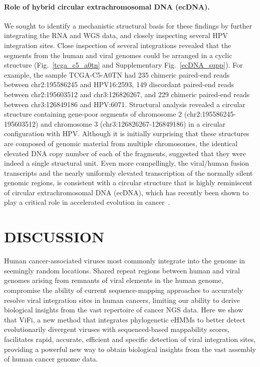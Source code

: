 \documentclass[a4,center,fleqn]{NAR}
\begin{document}
\paragraph{\textbf{Role of hybrid circular extrachromosomal DNA (ecDNA).}} We sought to identify a mechanistic structural basis for these
findings by further integrating the RNA and WGS data, and closely
inspecting several HPV integration sites. Close inspection of several
integrations revealed that the segments from the human and viral
genomes could be arranged in a cyclic structure (Fig.~\ref{tcga_c5_a0tn}
and Supplementary Fig.~\ref{ecDNA_supp}).  For example, the sample
TCGA-C5-A0TN had 235 chimeric paired-end reads between chr2:195586245
and HPV16:2593, 149 discordant paired-end reads between chr2:195603512
and chr3:126826267, and 229 chimeric paired-end reads between
chr3:126849186 and HPV:6071. Structural analysis revealed a circular
structure containing gene-poor segments of chromosome 2 (chr2:195586245-195603512) and 
chromosome 3 (chr3:126826267-126849186) in a circular
configuration with HPV. Although it is initially surprising that these
structures are composed of genomic material from multiple chromosomes,
the identical elevated DNA copy number of each of the fragments,
suggested that they were indeed a single structural unit. Even more
compellingly, the viral/human fusion transcripts and the nearly
uniformly elevated transcription of the normally silent genomic
regions, is consistent with a circular structure that is highly
reminiscent of circular extrachromosomal DNA (ecDNA), which has
recently been shown to play a critical role in accelerated evolution
in cancer~\cite{Turner2017}.

\section{DISCUSSION}
Human cancer-associated viruses most commonly integrate into the genome in seemingly random locations. Shared repeat regions between human and viral genomes arising from remnants of viral elements in the human genome, compromise the ability of current sequence-mapping approaches to accurately resolve viral integration sites in human cancers, limiting our ability to derive biological insights from the vast repertoire of cancer NGS data. Here we show that ViFi, a new method that integrates phylogenetic 
eHMMs to better detect evolutionarily divergent viruses with 
sequenced-based mappability scores, facilitates rapid, accurate, efficient and specific detection of viral integration sites, providing a powerful new way to obtain biological insights from the vast assembly of human cancer genome data. 
\end{document}
